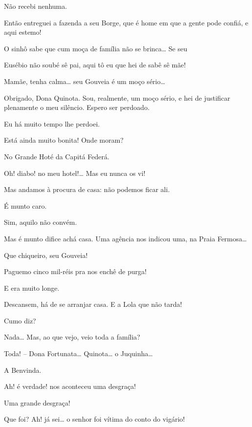  Não recebi nenhuma.

 Então entreguei a fazenda a seu Borge, que é home em que a gente
pode confiá, e aqui estemo!

 O sinhô sabe que cum moça de família não se brinca\ldots{} Se seu

Eusébio não soubé sê pai, aqui tô eu que hei de sabê sê mãe!

 Mamãe, tenha calma\ldots{} seu Gouveia é um moço sério\ldots{}

 Obrigado, Dona Quinota. Sou, realmente, um moço sério, e hei de
justificar plenamente o meu silêncio. Espero ser perdoado.

 Eu há muito tempo lhe perdoei.

  Está ainda muito bonita!  Onde moram?

 No Grande Hoté da Capitá Federá.

  Oh! diabo! no meu hotel!\ldots{} Mas eu nunca os vi!

 Mas andamos à procura de casa: não podemos ficar ali.

 É munto caro.

 Sim, aquilo não convém.

 Mas é munto difice achá casa. Uma agência nos indicou uma, na
Praia Fermosa\ldots{}

 Que chiqueiro, seu Gouveia!

 Paguemo cinco mil-réis pra nos enchê de purga!

 E era muito longe.

 Descansem, há de se arranjar casa.  E a Lola que não
tarda!

 Cumo diz?

 Nada\ldots{} Mas, ao que vejo, veio toda a família?

 Toda! -- Dona Fortunata\ldots{} Quinota\ldots{} o Juquinha\ldots{}

 A Benvinda.

 Ah! é verdade! nos aconteceu uma desgraça!

 Uma grande desgraça!

 Que foi? Ah! já sei\ldots{} o senhor foi vítima do conto do vigário!

